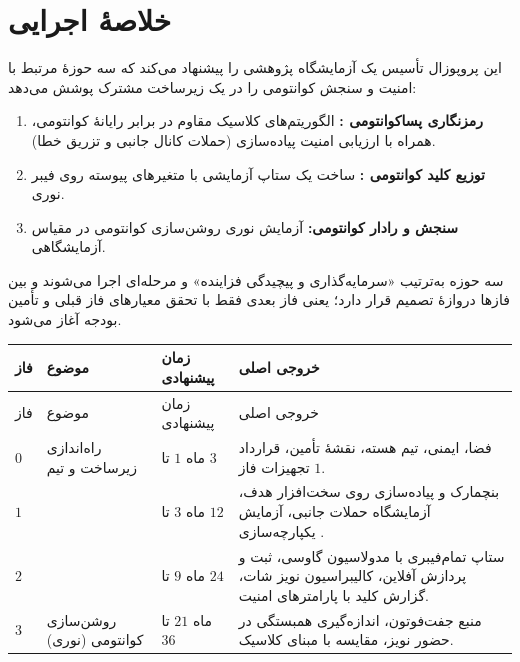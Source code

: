 \section{خلاصهٔ اجرایی}
این پروپوزال تأسیس یک آزمایشگاه پژوهشی را پیشنهاد می‌کند که سه حوزهٔ مرتبط با امنیت و سنجش کوانتومی را در یک زیرساخت مشترک پوشش می‌دهد:
\begin{enumerate}[leftmargin=*,itemsep=2pt]
\item \textbf{رمزنگاری پساکوانتومی :} الگوریتم‌های کلاسیک مقاوم در برابر رایانهٔ کوانتومی، همراه با ارزیابی امنیت پیاده‌سازی (حملات کانال جانبی و تزریق خطا).
\item \textbf{توزیع کلید کوانتومی :} ساخت یک ستاپ آزمایشی با متغیرهای پیوسته  روی فیبر نوری.
\item \textbf{سنجش و رادار کوانتومی:} آزمایش نوری روشن‌سازی کوانتومی  در مقیاس آزمایشگاهی.
\end{enumerate}

سه حوزه به‌ترتیب «سرمایه‌گذاری و پیچیدگی فزاینده» و مرحله‌ای اجرا می‌شوند و بین فازها دروازهٔ تصمیم قرار دارد؛ یعنی فاز بعدی فقط با تحقق معیارهای فاز قبلی و تأمین بودجه آغاز می‌شود.

\begin{longtable}{C{1cm}R{3.4cm}R{2.49cm}R{8cm}}
\toprule {} فاز & موضوع & زمان پیشنهادی & خروجی اصلی \\ \midrule
\endfirsthead
\toprule {} فاز & موضوع & زمان پیشنهادی & خروجی اصلی \\ \midrule
\endhead
$0$ & راه‌اندازی زیرساخت و تیم & ماه $1$ تا $3$ & فضا، ایمنی، تیم هسته، نقشهٔ تأمین، قرارداد تجهیزات فاز $1$. \\
$1$ &  & ماه $3$ تا $12$ & بنچمارک و پیاده‌سازی  روی سخت‌افزار هدف، آزمایشگاه حملات جانبی، آزمایش یکپارچه‌سازی . \\
$2$ &  & ماه $9$ تا $24$ & ستاپ تمام‌فیبری با مدولاسیون گاوسی، ثبت و پردازش آفلاین، کالیبراسیون نویز شات، گزارش کلید با پارامترهای امنیت. \\
$3$ & روشن‌سازی کوانتومی (نوری) & ماه $21$ تا $36$ & منبع جفت‌فوتون، اندازه‌گیری همبستگی در حضور نویز، مقایسه با مبنای کلاسیک. \\
\bottomrule\end{longtable}



